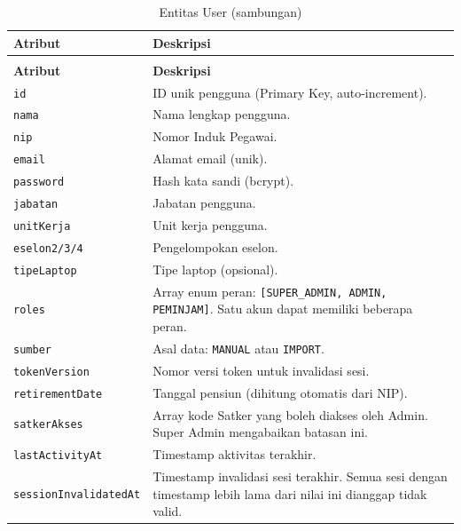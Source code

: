 \documentclass[
  12pt,
  a4paper,
  oneside,
  final
]{report}
\begin{document}
\begin{longtable}[!htbp]{p{3.5cm} p{9cm}}
  \caption{Entitas User}
  \label{tab:entitas-user} \\
  \toprule
  \textbf{Atribut} & \textbf{Deskripsi} \\
  \midrule
  \endfirsthead
  \caption[]{Entitas User (sambungan)} \\
  \toprule
  \textbf{Atribut} & \textbf{Deskripsi} \\
  \midrule
  \endhead
  \bottomrule
  \endfoot

  \texttt{id}                & ID unik pengguna (Primary Key, auto-increment). \\
  \texttt{nama}             & Nama lengkap pengguna. \\
  \texttt{nip}              & Nomor Induk Pegawai. \\
  \texttt{email}            & Alamat email (unik). \\
  \texttt{password}         & Hash kata sandi (bcrypt). \\
  \texttt{jabatan}          & Jabatan pengguna. \\
  \texttt{unitKerja}        & Unit kerja pengguna. \\
  \texttt{eselon2/3/4}      & Pengelompokan eselon. \\
  \texttt{tipeLaptop}       & Tipe laptop (opsional). \\
  \texttt{roles}            & Array enum peran: \texttt{[SUPER\_ADMIN, ADMIN, PEMINJAM]}.
                              Satu akun dapat memiliki beberapa peran. \\
  \texttt{sumber}           & Asal data: \texttt{MANUAL} atau \texttt{IMPORT}. \\
  \texttt{tokenVersion}     & Nomor versi token untuk invalidasi sesi. \\
  \texttt{retirementDate}   & Tanggal pensiun (dihitung otomatis dari NIP). \\
  \texttt{satkerAkses}      & Array kode Satker yang boleh diakses oleh Admin.
                              Super Admin mengabaikan batasan ini. \\
  \texttt{lastActivityAt}   & Timestamp aktivitas terakhir. \\
  \texttt{sessionInvalidatedAt} & Timestamp invalidasi sesi terakhir.
                              Semua sesi dengan timestamp lebih lama
                              dari nilai ini dianggap tidak valid. \\
\end{longtable}
\end{document}
